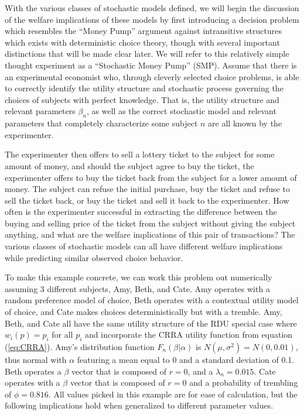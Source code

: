 \documentclass[11pt,a4paper]{article}
\begin{document}
With the various classes of stochastic models defined, we will begin the discussion of the welfare implications of these models by first introducing a decision problem which resembles the \enquote{Money Pump} argument against intransitive structures which exists with deterministic choice theory, though with several important distinctions that will be made clear later.
We will refer to this relatively simple thought experiment as a \enquote{Stochastic Money Pump} (SMP).
Assume that there is an experimental economist who, through cleverly selected choice problems, is able to correctly identify the utility structure and stochastic process governing the choices of subjects with perfect knowledge.
That is, the utility structure and relevant parameters $\beta_n$, as well as the correct stochastic model and relevant parameters that completely characterize some subject $n$ are all known by the experimenter.

The experimenter then offers to sell a lottery ticket to the subject for some amount of money, and should the subject agree to buy the ticket, the experimenter offers to buy the ticket back from the subject for a lower amount of money.
The subject can refuse the initial purchase, buy the ticket and refuse to sell the ticket back, or buy the ticket and sell it back to the experimenter.
How often is the experimenter successful in extracting the difference between the buying and selling price of the ticket from the subject without giving the subject anything, and what are the welfare implications of this pair of transactions?
The various classes of stochastic models can all have different welfare implications while predicting similar observed choice behavior.

To make this example concrete, we can work this problem out numerically assuming 3 different subjects, Amy, Beth, and Cate.
Amy operates with a random preference model of choice, Beth operates with a contextual utility model of choice, and Cate makes choices deterministically but with a tremble.
Amy, Beth, and Cate all have the same utility structure of the RDU special case where $w_i(p)=p_i$ for all $p_i$ and incorporate the CRRA utility function from equation (\ref{eq:CRRA}).
Amy's distribution function $F_n(\beta|\alpha)$ is $N(\mu,\sigma^2) = N(0,0.01)$, thus normal with $\alpha$ featuring a mean equal to 0 and a standard deviation of 0.1.
Beth operates a $\beta$ vector that is composed of $r=0$, and a $\lambda_n = 0.015$.
Cate operates with a $\beta$ vector that is composed of $r=0$ and a probability of trembling of $\phi = 0.816$.
All values picked in this example are for ease of calculation, but the following implications hold when generalized to different parameter values.
\end{document}
